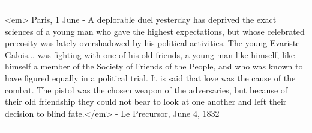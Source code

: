 \par\noindent\rule{\textwidth}{0.4pt}
<em>
Paris, 1 June - A deplorable duel yesterday has deprived the exact 
sciences of a young man who gave the highest expectations, but whose 
celebrated precosity was lately overshadowed by his political activities.  
The young Evariste Galois... was fighting with one of his old friends,
a young man like himself, like himself a member of the Society of
Friends of the People, and who was known to have figured equally in
a political trial.  It is said that love was the cause of the combat.
The pistol was the chosen weapon of the adversaries, but because of
their old friendship they could not bear to look at one another and 
left their decision to blind fate.</em> - Le Precursor, June 4, 1832

\par\noindent\rule{\textwidth}{0.4pt}

